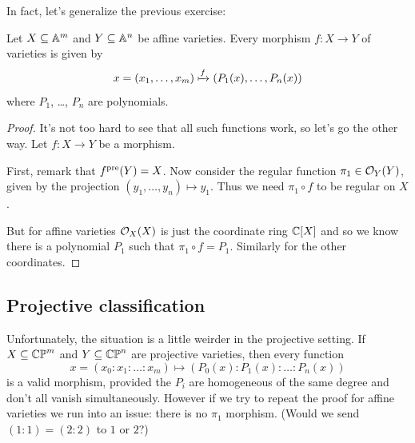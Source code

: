 In fact, let's generalize the previous exercise:
\begin{theorem}
	Let $X \subseteq \mathbb A^m$ and $Y \subseteq \mathbb A^n$ be affine varieties.
	Every morphism $f \colon X \to Y$ of varieties is given by
	\[
		x = \left( x_1, \dots, x_m \right)
		\xmapsto{f} \left( P_1(x), \dots, P_n(x) \right)
	\]
	where $P_1$, \dots, $P_n$ are polynomials.
	\label{thm:affine_global_polynomial}
\end{theorem}
\begin{proof}
	It's not too hard to see that all such functions work,
	so let's go the other way.
	Let $f \colon X \to Y$ be a morphism.

	First, remark that $f^{\text{pre}}(Y) = X$.
	Now consider the regular function $\pi_1 \in \mathcal O_Y(Y)$,
	given by the projection $(y_1, \dots, y_n) \mapsto y_1$.
	Thus we need $\pi_1 \circ f$ to be regular on $X$.

	But for affine varieties $\mathcal O_X(X)$ is just the coordinate ring $\mathbb C[X]$
	and so we know there is a polynomial $P_1$ such that $\pi_1 \circ f = P_1$.
	Similarly for the other coordinates.
\end{proof}

\subsection{Projective classification}
Unfortunately, the situation is a little weirder in the projective setting.
If $X \subseteq \mathbb{CP}^m$ and $Y \subseteq \mathbb{CP}^n$ are projective varieties,
then every function
\[
	x = \left( x_0 : x_1 : \dots : x_m \right)
	\mapsto \left( P_0(x) : P_1(x) : \dots : P_n(x) \right)
\]
is a valid morphism, provided the $P_i$ are homogeneous
of the same degree and don't all vanish simultaneously.
However if we try to repeat the proof for affine varieties
we run into an issue: there is no $\pi_1$ morphism.
(Would we send $(1:1) = (2:2)$ to $1$ or $2$?)

